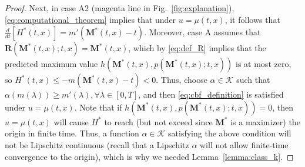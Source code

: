 \documentclass[10pt,conference]{ieeeconf}
\renewcommand{\(}{\left(}
\renewcommand{\)}{\right)}
\renewcommand{\[}{\left[}
\renewcommand{\]}{\right]}
\newcommand{\reals}{\mathbb{R}}
\begin{document}
\begin{proof}
Next, in case A2 (magenta line in Fig.~\ref{fig:explanation}), \eqref{eq:computational_theorem} implies that under $u = \mu(t,x)$, it follows that $\frac{d}{dt}[H^*(t,x)] = m'(\boldsymbol{M}^*(t,x) - t)$. Moreover, case A assumes that $\boldsymbol{R}(\boldsymbol{M}^*(t,x);t,x) = \boldsymbol{M}^*(t,x)$, which by \eqref{eq:def_R} implies that the predicted maximum value $h(\boldsymbol{M}^*(t,x),p(\boldsymbol{M}^*(t,x);t,x))$ is at most zero, so $H^*(t,x) \leq -m(\boldsymbol{M}^*(t,x) - t) < 0$.
Thus, choose $\alpha \in \mathcal{K}$ such that $\alpha(m(\lambda)) \geq m'(\lambda), \forall \lambda \in [0,T]$, and then \eqref{eq:cbf_definition} is satisfied under $u = \mu(t,x)$. Note that if $h(\boldsymbol{M}^*(t,x),p(\boldsymbol{M}^*(t,x);t,x)) = 0$, then $u = \mu(t,x)$ will cause $H^*$ to reach (but not exceed since $\boldsymbol{M}^*$ is a maximizer) the origin in finite time. Thus, a function $\alpha \in \mathcal{K}$ satisfying the above condition will not be Lipschitz continuous (recall that a Lipschitz $\alpha$ will not allow finite-time convergence to the origin), which is why we needed Lemma~\ref{lemma:class_k}.


\end{proof}
\end{document}
